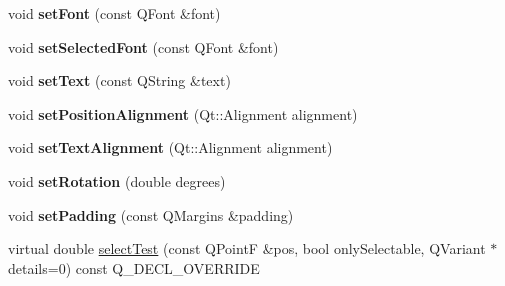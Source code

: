 \begin{DoxyCompactItemize}
void {\bfseries set\+Font} (const Q\+Font \&font)
\item 
\mbox{\label{class_q_c_p_item_text_a0be2841772f83663c4db307928b82816}} 
void {\bfseries set\+Selected\+Font} (const Q\+Font \&font)
\item 
\mbox{\label{class_q_c_p_item_text_a3dacdda0ac88f99a05b333b977c48747}} 
void {\bfseries set\+Text} (const Q\+String \&text)
\item 
\mbox{\label{class_q_c_p_item_text_a781cdf8c640fc6a055dcff1e675c8c7a}} 
void {\bfseries set\+Position\+Alignment} (Qt\+::\+Alignment alignment)
\item 
\mbox{\label{class_q_c_p_item_text_ab5bc0684c4d1bed81949a11b34dba478}} 
void {\bfseries set\+Text\+Alignment} (Qt\+::\+Alignment alignment)
\item 
\mbox{\label{class_q_c_p_item_text_a4bcc10cd97952c3f749d75824b5077f0}} 
void {\bfseries set\+Rotation} (double degrees)
\item 
\mbox{\label{class_q_c_p_item_text_aeea8a3e01f135f9dd0bb08f51db66310}} 
void {\bfseries set\+Padding} (const Q\+Margins \&padding)
\item 
virtual double \hyperlink{class_q_c_p_item_text_ab9d7938a7445f16a00391e9355a5ceaa}{select\+Test} (const Q\+PointF \&pos, bool only\+Selectable, Q\+Variant $\ast$details=0) const Q\+\_\+\+D\+E\+C\+L\+\_\+\+O\+V\+E\+R\+R\+I\+DE
\end{DoxyCompactItemize}
